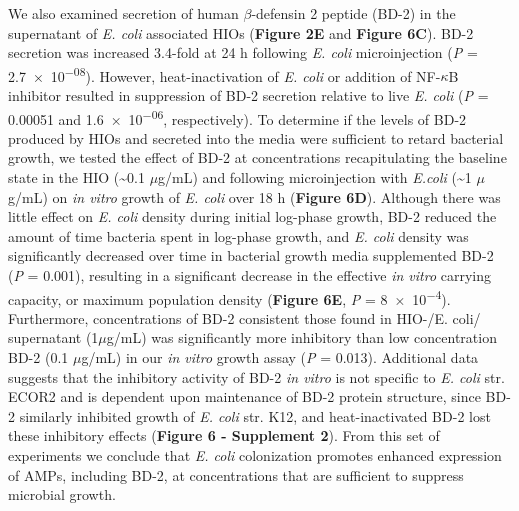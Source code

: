 \documentclass[9pt,lineo]{elife}
\begin{document}
We also examined secretion of human \(\beta\)-defensin 2 peptide (BD-2) in the supernatant of \emph{E. coli} associated HIOs (\textbf{Figure 2E} and \textbf{Figure 6C}). BD-2 secretion was increased 3.4-fold at 24 h following \emph{E. coli} microinjection (\emph{P} = \num{2.7e-08}). However, heat-inactivation of \emph{E. coli} or addition of NF-\(\kappa\)B inhibitor resulted in suppression of BD-2 secretion relative to live \emph{E. coli} (\emph{P} = \num{0.00051} and \num{1.6e-06}, respectively). To determine if the levels of BD-2 produced by HIOs and secreted into the media were sufficient to retard bacterial growth, we tested the effect of BD-2 at concentrations recapitulating the baseline state in the HIO (\textasciitilde{}0.1 \(\mu\)g/mL) and following microinjection with \emph{E.coli} (\textasciitilde{}1 \(\mu\)g/mL) on \emph{in vitro} growth of \emph{E. coli} over 18 h (\textbf{Figure 6D}). Although there was little effect on \emph{E. coli} density during initial log-phase growth, BD-2 reduced the amount of time bacteria spent in log-phase growth, and \emph{E. coli} density was significantly decreased over time in bacterial growth media supplemented BD-2 (\emph{P} = \num{0.001}), resulting in a significant decrease in the effective \emph{in vitro} carrying capacity, or maximum population density (\textbf{Figure 6E}, \emph{P} = \num{8e-4}). Furthermore, concentrations of BD-2 consistent those found in HIO-/E. coli/ supernatant (1\(\mu\)g/mL) was significantly more inhibitory than low concentration BD-2 (0.1 \(\mu\)g/mL) in our \emph{in vitro} growth assay (\emph{P} = 0.013). Additional data suggests that the inhibitory activity of BD-2 \emph{in vitro} is not specific to \emph{E. coli} str. ECOR2 and is dependent upon maintenance of BD-2 protein structure, since BD-2 similarly inhibited growth of \emph{E. coli} str. K12, and heat-inactivated BD-2 lost these inhibitory effects (\textbf{Figure 6 - Supplement 2}). From this set of experiments we conclude that \emph{E. coli} colonization promotes enhanced expression of AMPs, including BD-2, at concentrations that are sufficient to suppress microbial growth.
\end{document}

